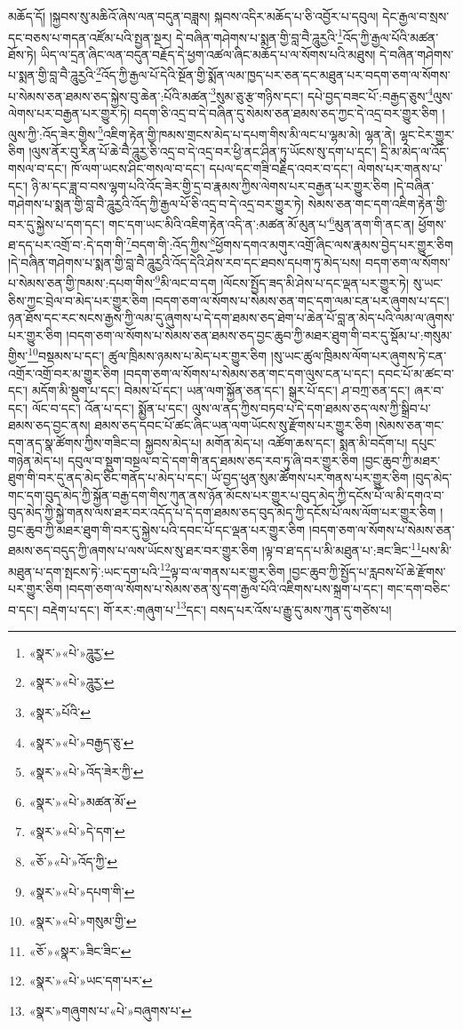 མཆོད་དོ། །སྐྱབས་སུ་མཆིའོ་ཞེས་ལན་བདུན་བཟླས། སྐབས་འདིར་མཆོད་པ་ཅི་འབྱོར་པ་དབུལ། དེང་རྒྱལ་བ་སྲས་དང་བཅས་པ་གདན་འཛོམ་པའི་སྤྱན་སྔར། དེ་བཞིན་གཤེགས་པ་སྨན་གྱི་བླ་བཻ་ཌཱུརྱའི་\footnote{«སྣར་»«པེ་»ཌཱུརྱ་}འོད་ཀྱི་རྒྱལ་པོའི་མཚན་ཐོས་ཏེ། ཡིད་ལ་དྲན་ཞིང་ལན་བདུན་བརྗོད་དེ་ཕྱག་འཚལ་ཞིང་མཆོད་པ་ལ་སོགས་པའི་མཐུས། དེ་བཞིན་གཤེགས་པ་སྨན་གྱི་བླ་བཻ་ཌཱུརྱའི་\footnote{«སྣར་»«པེ་»ཌཱུརྱ་}འོད་ཀྱི་རྒྱལ་པོ་དེའི་སྔོན་གྱི་སྨོན་ལམ་ཁྱད་པར་ཅན་དང་མཐུན་པར་བདག་ཅག་ལ་སོགས་པ་སེམས་ཅན་ཐམས་ཅད་སྐྱེས་བུ་ཆེན་:པོའི་མཚན་\footnote{«སྣར་»པོའི་}སུམ་ཅུ་རྩ་གཉིས་དང་། དཔེ་བྱད་བཟང་པོ་:བརྒྱད་ཅུས་\footnote{«སྣར་»«པེ་»བརྒྱད་ཅུ་}ལུས་ལེགས་པར་བརྒྱན་པར་གྱུར་ཏེ། བདག་ཅི་འདྲ་བ་དེ་བཞིན་དུ་སེམས་ཅན་ཐམས་ཅད་ཀྱང་དེ་འདྲ་བར་གྱུར་ཅིག །ལུས་ཀྱི་:འོད་ཟེར་གྱིས་\footnote{«སྣར་»«པེ་»འོད་ཟེར་ཀྱི་}འཇིག་རྟེན་གྱི་ཁམས་གྲངས་མེད་པ་དཔག་གིས་མི་ལང་པ་ལྷམ་མེ། ལྷན་ནེ། ལྷང་ངེར་གྱུར་ཅིག །ལུས་ནོར་བུ་རིན་པོ་ཆེ་བཻ་ཌཱུརྱ་ཅི་འདྲ་བ་དེ་འདྲ་བར་ཕྱི་ནང་ཤིན་ཏུ་ཡོངས་སུ་དག་པ་དང་། དྲི་མ་མེད་ལ་འོད་གསལ་བ་དང་། ཁོ་ལག་ཡངས་ཤིང་གསལ་བ་དང་། དཔལ་དང་གཟི་བརྗིད་འབར་བ་དང་། ལེགས་པར་གནས་པ་དང་། ཉི་མ་དང་ཟླ་བ་བས་ལྷག་པའི་འོད་ཟེར་གྱི་དྲ་བ་རྣམས་ཀྱིས་ལེགས་པར་བརྒྱན་པར་གྱུར་ཅིག །དེ་བཞིན་གཤེགས་པ་སྨན་གྱི་བླ་བཻ་ཌཱུརྱའི་འོད་ཀྱི་རྒྱལ་པོ་ཅི་འདྲ་བ་དེ་འདྲ་བར་གྱུར་ཏེ། སེམས་ཅན་གང་དག་འཇིག་རྟེན་གྱི་བར་དུ་སྐྱེས་པ་དག་དང་། གང་དག་ཡང་མིའི་འཇིག་རྟེན་འདི་ན་:མཚན་མོ་མུན་པ་\footnote{«སྣར་»«པེ་»མཚན་མོ་}མུན་ནག་གི་ནང་ན། ཕྱོགས་ཐ་དད་པར་འགྲོ་བ་:དེ་དག་གི་\footnote{«སྣར་»«པེ་»དེ་དག་}བདག་གི་:འོད་ཀྱིས་\footnote{«ཅོ་»«པེ་»འོད་ཀྱི་}ཕྱོགས་དགའ་མགུར་འགྲོ་ཞིང་ལས་རྣམས་བྱེད་པར་གྱུར་ཅིག །དེ་བཞིན་གཤེགས་པ་སྨན་གྱི་བླ་བཻ་ཌཱུརྱའི་འོད་དེའི་ཤེས་རབ་དང་ཐབས་དཔག་ཏུ་མེད་པས། བདག་ཅག་ལ་སོགས་པ་སེམས་ཅན་གྱི་ཁམས་:དཔག་གིས་\footnote{«སྣར་»«པེ་»དཔག་གི་}མི་ལང་བ་དག །ལོངས་སྤྱོད་ཟད་མི་ཤེས་པ་དང་ལྡན་པར་གྱུར་ཏེ། སུ་ཡང་ཅིས་ཀྱང་བྲེལ་བ་མེད་པར་གྱུར་ཅིག །བདག་ཅག་ལ་སོགས་པ་སེམས་ཅན་གང་དག་ལམ་ངན་པར་ཞུགས་པ་དང་། ཉན་ཐོས་དང་རང་སངས་རྒྱས་ཀྱི་ལམ་དུ་ཞུགས་པ་དེ་དག་ཐམས་ཅད་ཐེག་པ་ཆེན་པོ་བླ་ན་མེད་པའི་ལམ་ལ་ཞུགས་པར་གྱུར་ཅིག །བདག་ཅག་ལ་སོགས་པ་སེམས་ཅན་ཐམས་ཅད་བྱང་ཆུབ་ཀྱི་མཐར་ཐུག་གི་བར་དུ་སྡོམ་པ་:གསུམ་གྱིས་\footnote{«སྣར་»«པེ་»གསུམ་གྱི་}བསྡམས་པ་དང་། ཚུལ་ཁྲིམས་ཉམས་པ་མེད་པར་གྱུར་ཅིག །སུ་ཡང་ཚུལ་ཁྲིམས་ལོག་པར་ཞུགས་ཏེ་ངན་འགྲོར་འགྲོ་བར་མ་གྱུར་ཅིག །བདག་ཅག་ལ་སོགས་པ་སེམས་ཅན་གང་དག་ལུས་ངན་པ་དང་། དབང་པོ་མ་ཚང་བ་དང་། མདོག་མི་སྡུག་པ་དང་། བེམས་པོ་དང་། ཡན་ལག་སྐྱོན་ཅན་དང་། སྒུར་པོ་དང་། ཤ་བཀྲ་ཅན་དང་། ཞར་བ་དང་། ལོང་བ་དང་། འོན་པ་དང་། སྨྱོན་པ་དང་། ལུས་ལ་ནད་ཀྱིས་བཏབ་པ་དེ་དག་ཐམས་ཅད་ལས་ཀྱི་སྒྲིབ་པ་ཐམས་ཅད་བྱང་ནས། ཐམས་ཅད་དབང་པོ་ཚང་ཞིང་ཡན་ལག་ཡོངས་སུ་རྫོགས་པར་གྱུར་ཅིག །སེམས་ཅན་གང་དག་ནད་སྣ་ཚོགས་ཀྱིས་གཟིང་བ། སྐྱབས་མེད་པ། མགོན་མེད་པ། འཚོག་ཆས་དང་། སྨན་མི་བདོག་པ། དཔུང་གཉེན་མེད་པ། དབུལ་བ་སྡུག་བསྔལ་བ་དེ་དག་གི་ནད་ཐམས་ཅད་རབ་ཏུ་ཞི་བར་གྱུར་ཅིག །བྱང་ཆུབ་ཀྱི་མཐར་ཐུག་གི་བར་དུ་ནད་མེད་ཅིང་གནོད་པ་མེད་པ་དང་། ཡོ་བྱད་ཕུན་སུམ་ཚོགས་པར་གནས་པར་གྱུར་ཅིག །བུད་མེད་གང་དག་བུད་མེད་ཀྱི་སྐྱོན་བརྒྱ་དག་གིས་ཀུན་ནས་ཉོན་མོངས་པར་གྱུར་པ་བུད་མེད་ཀྱི་དངོས་པོ་ལ་མི་དགའ་བ་བུད་མེད་ཀྱི་སྐྱེ་གནས་ལས་ཐར་བར་འདོད་པ་དེ་དག་ཐམས་ཅད་བུད་མེད་ཀྱི་དངོས་པོ་ལས་ལོག་པར་གྱུར་ཅིག །བྱང་ཆུབ་ཀྱི་མཐར་ཐུག་གི་བར་དུ་སྐྱེས་པའི་དབང་པོ་དང་ལྡན་པར་གྱུར་ཅིག །བདག་ཅག་ལ་སོགས་པ་སེམས་ཅན་ཐམས་ཅད་བདུད་ཀྱི་ཞགས་པ་ལས་ཡོངས་སུ་ཐར་བར་གྱུར་ཅིག །ལྟ་བ་ཐ་དད་པ་མི་མཐུན་པ་:ཟང་ཟིང་\footnote{«ཅོ་»«སྣར་»ཟིང་ཟིང་}པས་མི་མཐུན་པ་དག་སྤངས་ཏེ་:ཡང་དག་པའི་\footnote{«སྣར་»«པེ་»ཡང་དག་པར་}ལྟ་བ་ལ་གནས་པར་གྱུར་ཅིག །བྱང་ཆུབ་ཀྱི་སྤྱོད་པ་རླབས་པོ་ཆེ་རྫོགས་པར་གྱུར་ཅིག །བདག་ཅག་ལ་སོགས་པ་སེམས་ཅན་སུ་དག་རྒྱལ་པོའི་འཇིགས་པས་སྐྲག་པ་དང་། གང་དག་བཅིང་བ་དང་། བརྡེག་པ་དང་། གོ་རར་:གཞུག་པ་\footnote{«སྣར་»གཞུགས་པ་«པེ་»བཞུགས་པ་}དང་། བསད་པར་འོས་པ་རྒྱུ་དུ་མས་ཀུན་དུ་གཙེས་པ། 